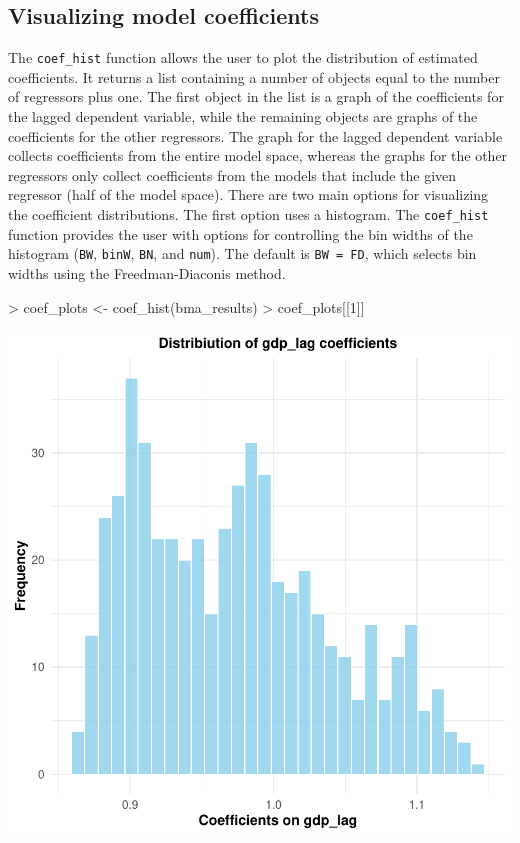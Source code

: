 \documentclass[a4paper]{article}
\begin{document}
\subsection{Visualizing model coefficients}
The \verb+coef_hist+ function allows the user to plot the distribution of estimated coefficients. It returns a list containing a number of objects equal to the number of regressors plus one. The first object in the list is a graph of the coefficients for the lagged dependent variable, while the remaining objects are graphs of the coefficients for the other regressors. The graph for the lagged dependent variable collects coefficients from the entire model space, whereas the graphs for the other regressors only collect coefficients from the models that include the given regressor (half of the model space). There are two main options for visualizing the coefficient distributions. The first option uses a histogram.
The \verb+coef_hist+ function provides the user with options for controlling the bin widths of the histogram (\verb+BW+, \verb+binW+, \verb+BN+, and \verb+num+). The default is \verb+BW = FD+, which selects bin widths using the Freedman-Diaconis method.
\begin{Schunk}
\begin{Sinput}
> coef_plots <- coef_hist(bma_results)
> coef_plots[[1]]
\end{Sinput}
\end{Schunk}
\includegraphics{bdsm_vignette-023}
\end{document}

